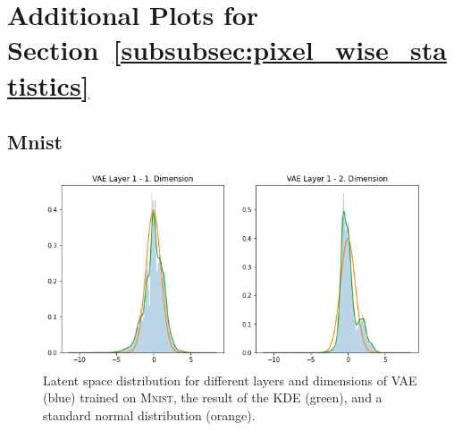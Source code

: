 \documentclass[11pt,a4paper]{article}
\let\oldsection\section
\renewcommand\section{\clearpage\oldsection}
\begin{document}
\pagebreak
\section{Additional Plots for Section~\ref{subsubsec:pixel_wise_statistics}}\label{sec:appendix_pixel_wise_statistics}
\subsection{Mnist}\label{subsec:appendix_pixel_wise_statistics_mnist}
\begin{figure}[H]
\centering
\includegraphics[width=.8\textwidth]{images/generated_vs_true/mnist/vae_kde.png}
\caption[\ac{VAE} on \textsc{Mnist}: Estimated Latent Space Distribution]{Latent space distribution for different layers and dimensions of \ac{VAE} (blue) trained on \textsc{Mnist}, the result of the \ac{KDE} (green), and a standard normal distribution (orange).}
\end{figure}
\end{document}
